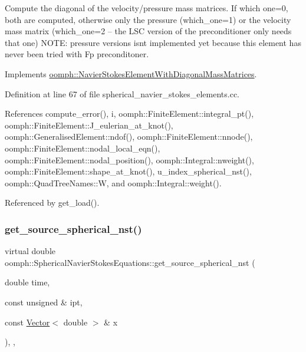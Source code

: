 Compute the diagonal of the velocity/pressure mass matrices. If which one=0, both are computed, otherwise only the pressure (which\+\_\+one=1) or the velocity mass matrix (which\+\_\+one=2 -- the L\+SC version of the preconditioner only needs that one) N\+O\+TE\+: pressure versions isn\textquotesingle{}t implemented yet because this element has never been tried with Fp preconditoner. 

Implements \hyperlink{classoomph_1_1NavierStokesElementWithDiagonalMassMatrices_a4d491d10823eee10381a9b14bce6c244}{oomph\+::\+Navier\+Stokes\+Element\+With\+Diagonal\+Mass\+Matrices}.



Definition at line 67 of file spherical\+\_\+navier\+\_\+stokes\+\_\+elements.\+cc.



References compute\+\_\+error(), i, oomph\+::\+Finite\+Element\+::integral\+\_\+pt(), oomph\+::\+Finite\+Element\+::\+J\+\_\+eulerian\+\_\+at\+\_\+knot(), oomph\+::\+Generalised\+Element\+::ndof(), oomph\+::\+Finite\+Element\+::nnode(), oomph\+::\+Finite\+Element\+::nodal\+\_\+local\+\_\+eqn(), oomph\+::\+Finite\+Element\+::nodal\+\_\+position(), oomph\+::\+Integral\+::nweight(), oomph\+::\+Finite\+Element\+::shape\+\_\+at\+\_\+knot(), u\+\_\+index\+\_\+spherical\+\_\+nst(), oomph\+::\+Quad\+Tree\+Names\+::W, and oomph\+::\+Integral\+::weight().



Referenced by get\+\_\+load().

\mbox{\label{classoomph_1_1SphericalNavierStokesEquations_afac2bf109a54ca1753b3e9eb5b5859ff}} 
\subsubsection{\texorpdfstring{get\+\_\+source\+\_\+spherical\+\_\+nst()}{get\_source\_spherical\_nst()}}
{\footnotesize\ttfamily virtual double oomph\+::\+Spherical\+Navier\+Stokes\+Equations\+::get\+\_\+source\+\_\+spherical\+\_\+nst (\begin{DoxyParamCaption}\item[{double}]{time,  }\item[{const unsigned \&}]{ipt,  }\item[{const \hyperlink{classoomph_1_1Vector}{Vector}$<$ double $>$ \&}]{x }\end{DoxyParamCaption})\hspace{0.3cm}{\ttfamily [inline]}, {\ttfamily [protected]}, {\ttfamily [virtual]}}



